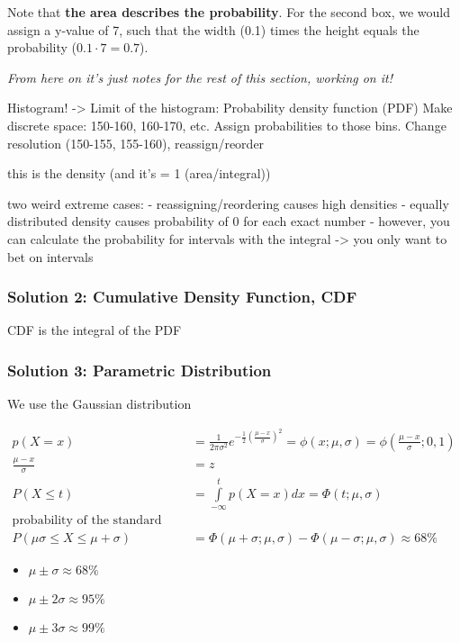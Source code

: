 Note that \textbf{the area describes the probability}. For the second box, we would assign a y-value of 7, such that the width (0.1) times the height equals the probability ($0.1\cdot 7 = 0.7$).

\textit{From here on it's just notes for the rest of this section, working on it!}

Histogram! -> Limit of the histogram: Probability density function (PDF)
Make discrete space: 150-160, 160-170, etc.
Assign probabilities to those bins.
Change resolution (150-155, 155-160), reassign/reorder 

this is the density (and it's = 1 (area/integral))

two weird extreme cases:
- reassigning/reordering causes high densities
- equally distributed density causes probability of 0 for each exact number
   - however, you can calculate the probability for intervals with the integral
   -> you only want to bet on intervals

\subsubsection[Cumulative Density Function (CDF)]{Solution 2: Cumulative Density Function, CDF}
CDF is the integral of the PDF

\subsubsection{Solution 3: Parametric Distribution}
We use the Gaussian distribution

\begin{align*}
p(X=x) &= \frac{1}{2\pi\sigma^2}e^{-\frac{1}{2}\left(\frac{\mu-x}{\sigma}\right)^2} = \phi(x;\mu,\sigma) = \phi\left(\frac{\mu-x}{\sigma};0,1\right) \\
\frac{\mu-x}{\sigma}&=z \\
P(X \leq t) &= \int\limits_{-\infty}^{t}{p(X=x)} dx = \Phi(t;\mu,\sigma) \\
\mbox{probability of the standard deviation: } \\
P(\mu\sigma \leq X \leq \mu + \sigma) &= \Phi(\mu+\sigma;\mu,\sigma) - \Phi(\mu-\sigma;\mu,\sigma) \approx 68\%
\end{align*}

\begin{itemize}
	\item $\mu \pm \sigma \approx 68\%$
	\item $\mu \pm 2\sigma \approx 95\%$
	\item $\mu \pm 3\sigma \approx 99\%$
\end{itemize}

